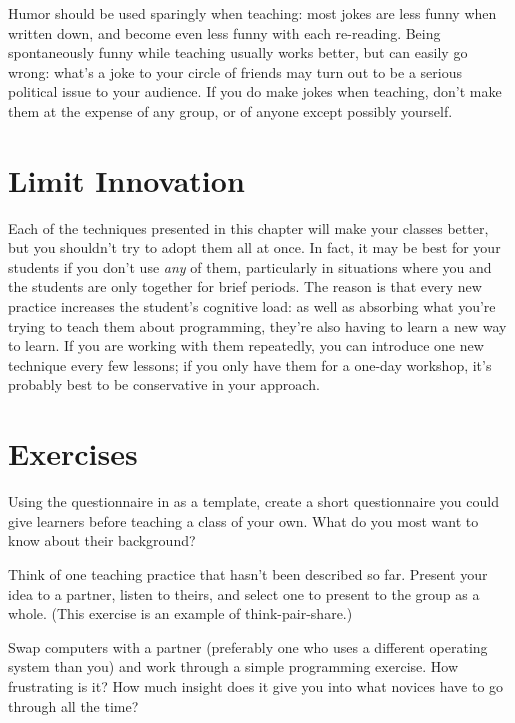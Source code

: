 Humor should be used sparingly when teaching: most jokes are less
funny when written down, and become even less funny with each
re-reading.  Being spontaneously funny while teaching usually works
better, but can easily go wrong: what's a joke to your circle of
friends may turn out to be a serious political issue to your
audience. If you do make jokes when teaching, don't make them at the
expense of any group, or of anyone except possibly yourself.

\section{Limit Innovation}\label{s:classroom-innovate}

Each of the techniques presented in this chapter will make your
classes better, but you shouldn't try to adopt them all at once.  In
fact, it may be best for your students if you don't use \emph{any} of
them, particularly in situations where you and the students are only
together for brief periods.  The reason is that every new practice
increases the student's cognitive load: as well as absorbing what
you're trying to teach them about programming, they're also having to
learn a new way to learn.  If you are working with them repeatedly,
you can introduce one new technique every few lessons; if you only
have them for a one-day workshop, it's probably best to be
conservative in your approach.

\section{Exercises}\label{s:classroom-exercises}


Using the questionnaire in  as a template, create
a short questionnaire you could give learners before teaching a class
of your own. What do you most want to know about their background?


Think of one teaching practice that hasn't been described so far.
Present your idea to a partner, listen to theirs, and select one to
present to the group as a whole.  (This exercise is an example of
think-pair-share.)


Swap computers with a partner (preferably one who uses a different
operating system than you) and work through a simple programming
exercise.  How frustrating is it?  How much insight does it give you
into what novices have to go through all the time?

